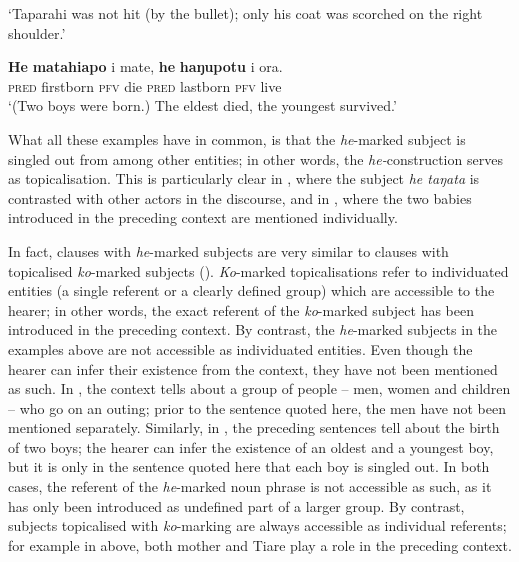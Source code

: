 \glt 
‘Taparahi was not hit (by the bullet); only his coat was scorched on the right shoulder.’ 

\z

\ea\label{ex:8.95}
\gll \textbf{He} \textbf{matahiapo} i mate, \textbf{he} \textbf{haŋupotu} i ora. \\
\textsc{pred} firstborn \textsc{pfv} die \textsc{pred} lastborn \textsc{pfv} live \\

\glt
‘(Two boys were born.) The eldest died, the youngest survived.’ \textstyleExampleref{[Fel-1978.121]}
\z

What all these examples have in common, is that the \textit{he}{}-marked subject is singled out from among other entities; in other words, the \textit{he-}construction serves as topicalisation. This is particularly clear in , where the subject \textit{he taŋata} is contrasted with other actors in the discourse, and in , where the two babies introduced in the preceding context are mentioned individually. 

In fact, clauses with \textit{he}{}-marked subjects are very similar to clauses with topicalised \textit{ko}{}-marked subjects (). \textit{Ko}{}-marked topicalisations refer to individuated entities (a single referent or a clearly defined group) which are accessible to the hearer; in other words, the exact referent of the \textit{ko}{}-marked subject has been introduced in the preceding context. By contrast, the \textit{he}{}-marked subjects in the examples above are not accessible as individuated entities. Even though the hearer can infer their existence from the context, they have not been mentioned as such. In , the context tells about a group of people – men, women and children – who go on an outing; prior to the sentence quoted here, the men have not been mentioned separately. Similarly, in , the preceding sentences tell about the birth of two boys; the hearer can infer the existence of an oldest and a youngest boy, but it is only in the sentence quoted here that each boy is singled out. In both cases, the referent of the \textit{he}{}-marked noun phrase is not accessible as such, as it has only been introduced as undefined part of a larger group. By contrast, subjects topicalised with \textit{ko}{}-marking are always accessible as individual referents; for example in  above, both mother and Tiare play a role in the preceding context.

